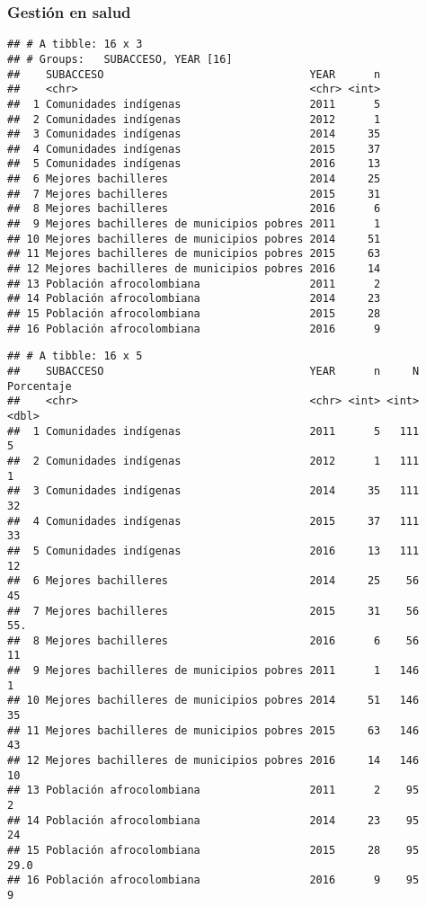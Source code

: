 \documentclass[]{article}
\theoremstyle{definition}
\theoremstyle{definition}
\theoremstyle{definition}
\theoremstyle{remark}
\begin{document}
\subsubsection{Gestión en salud}\label{gestion-en-salud}

\begin{verbatim}
## # A tibble: 16 x 3
## # Groups:   SUBACCESO, YEAR [16]
##    SUBACCESO                                YEAR      n
##    <chr>                                    <chr> <int>
##  1 Comunidades indígenas                    2011      5
##  2 Comunidades indígenas                    2012      1
##  3 Comunidades indígenas                    2014     35
##  4 Comunidades indígenas                    2015     37
##  5 Comunidades indígenas                    2016     13
##  6 Mejores bachilleres                      2014     25
##  7 Mejores bachilleres                      2015     31
##  8 Mejores bachilleres                      2016      6
##  9 Mejores bachilleres de municipios pobres 2011      1
## 10 Mejores bachilleres de municipios pobres 2014     51
## 11 Mejores bachilleres de municipios pobres 2015     63
## 12 Mejores bachilleres de municipios pobres 2016     14
## 13 Población afrocolombiana                 2011      2
## 14 Población afrocolombiana                 2014     23
## 15 Población afrocolombiana                 2015     28
## 16 Población afrocolombiana                 2016      9
\end{verbatim}

\begin{verbatim}
## # A tibble: 16 x 5
##    SUBACCESO                                YEAR      n     N Porcentaje
##    <chr>                                    <chr> <int> <int>      <dbl>
##  1 Comunidades indígenas                    2011      5   111        5  
##  2 Comunidades indígenas                    2012      1   111        1  
##  3 Comunidades indígenas                    2014     35   111       32  
##  4 Comunidades indígenas                    2015     37   111       33  
##  5 Comunidades indígenas                    2016     13   111       12  
##  6 Mejores bachilleres                      2014     25    56       45  
##  7 Mejores bachilleres                      2015     31    56       55. 
##  8 Mejores bachilleres                      2016      6    56       11  
##  9 Mejores bachilleres de municipios pobres 2011      1   146        1  
## 10 Mejores bachilleres de municipios pobres 2014     51   146       35  
## 11 Mejores bachilleres de municipios pobres 2015     63   146       43  
## 12 Mejores bachilleres de municipios pobres 2016     14   146       10  
## 13 Población afrocolombiana                 2011      2    95        2  
## 14 Población afrocolombiana                 2014     23    95       24  
## 15 Población afrocolombiana                 2015     28    95       29.0
## 16 Población afrocolombiana                 2016      9    95        9
\end{verbatim}
\end{document}
